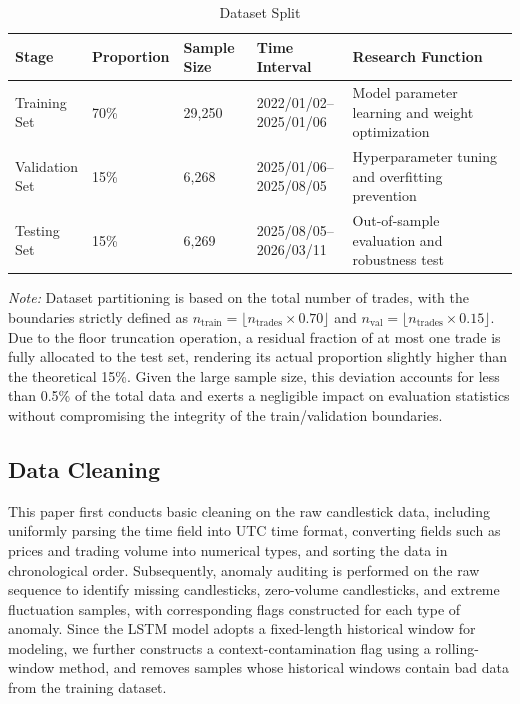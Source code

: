 \documentclass[12pt]{article}
\begin{document}
\begin{table}[H]
\centering
\caption{Dataset Split}
\label{tab:dataset_split}
\small
\setlength{\tabcolsep}{4pt}
\renewcommand{\arraystretch}{1.2}
\begin{tabular}{p{}p{}p{}p{}p{}}
\toprule
Stage & Proportion & Sample Size & Time Interval & Research Function \\
\midrule
\makecell{Training\\Set} &
70\% &
29,250 &
\makecell{2022/01/02--\\2025/01/06} &
Model parameter learning and weight optimization \\

\makecell{Validation\\Set} &
15\% &
6,268 &
\makecell{2025/01/06--\\2025/08/05} &
Hyperparameter tuning and overfitting prevention \\

\makecell{Testing\\Set} &
15\% &
6,269 &
\makecell{2025/08/05--\\2026/03/11} &
Out-of-sample evaluation and robustness test \\
\bottomrule
\end{tabular}
    \vspace{6pt} 
    \parbox{\textwidth}{\footnotesize \textit{Note:} Dataset partitioning is based on the total number of trades, with the boundaries strictly defined as $n_{\text{train}} = \lfloor n_{\text{trades}} \times 0.70 \rfloor$ and $n_{\text{val}} = \lfloor n_{\text{trades}} \times 0.15 \rfloor$. Due to the floor truncation operation, a residual fraction of at most one trade is fully allocated to the test set, rendering its actual proportion slightly higher than the theoretical 15\%. Given the large sample size, this deviation accounts for less than 0.5\% of the total data and exerts a negligible impact on evaluation statistics without compromising the integrity of the train/validation boundaries.}
\end{table}

\subsection{Data Cleaning}

This paper first conducts basic cleaning on the raw candlestick data, including uniformly parsing the time field into UTC time format, converting fields such as prices and trading volume into numerical types, and sorting the data in chronological order. Subsequently, anomaly auditing is performed on the raw sequence to identify missing candlesticks, zero-volume candlesticks, and extreme fluctuation samples, with corresponding flags constructed for each type of anomaly. Since the LSTM model adopts a fixed-length historical window for modeling, we further constructs a context-contamination flag using a rolling-window method, and removes samples whose historical windows contain bad data from the training dataset.
\end{document}
